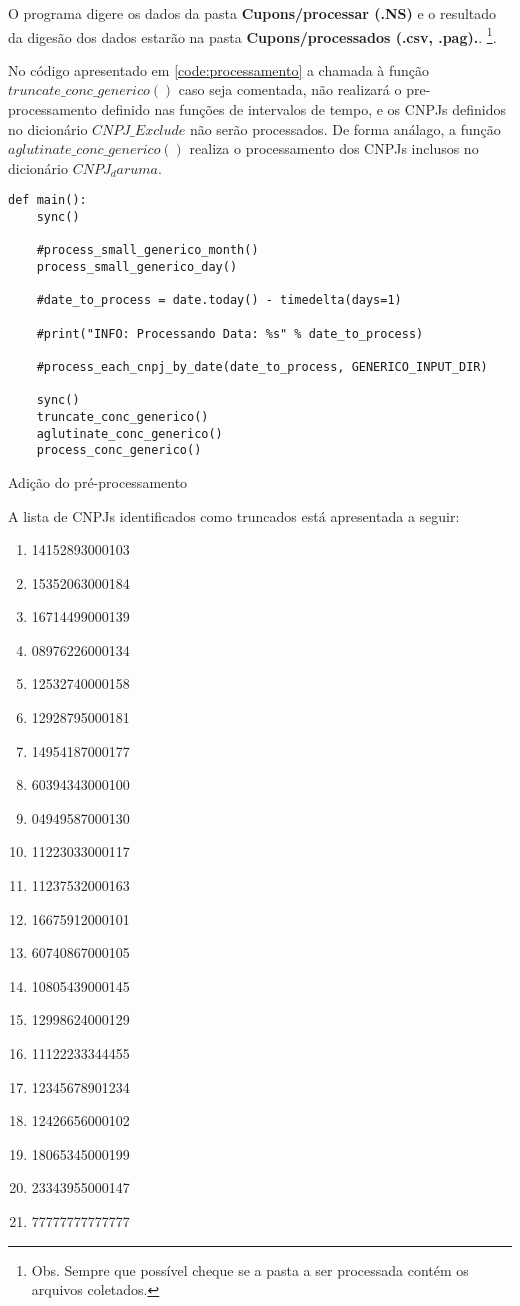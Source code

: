 \documentclass{article}      %
\begin{document}
O programa digere os dados da pasta \textbf{Cupons/processar (.NS)} e o resultado da digesão dos dados estarão na pasta \textbf{Cupons/processados (.csv, .pag).}.  \footnote{Obs. Sempre que possível cheque se a pasta a ser processada contém os arquivos coletados.}.

No código apresentado em \ref{code:processamento} a chamada à função $truncate\_conc\_generico()$ caso seja comentada, não realizará o pre-processamento definido nas funções de intervalos de tempo, e os CNPJs definidos no dicionário $CNPJ\_Exclude$ não serão processados. De forma análago, a função     $aglutinate\_conc\_generico()$ realiza o processamento dos CNPJs inclusos no dicionário $CNPJ_daruma$.
 
\begin{listing}[H]
\begin{verbatim}
def main():
    sync()
    
    #process_small_generico_month()
    process_small_generico_day()

    #date_to_process = date.today() - timedelta(days=1)
    
    #print("INFO: Processando Data: %s" % date_to_process)
    
    #process_each_cnpj_by_date(date_to_process, GENERICO_INPUT_DIR)

    sync()
    truncate_conc_generico()
    aglutinate_conc_generico()
    process_conc_generico()
\end{verbatim}

\caption{Adição do pré-processamento}
\label{code:processamento}

\end{listing}


A lista de CNPJs identificados como truncados está apresentada a seguir:

\begin{enumerate}
\item 14152893000103 
\item 15352063000184 
\item 16714499000139
\item 08976226000134
\item 12532740000158 
\item 12928795000181 
\item 14954187000177 
\item 60394343000100 
\item 04949587000130 
\item 11223033000117
\item 11237532000163
\item 16675912000101 
\item 60740867000105 
\item 10805439000145
\item 12998624000129 
\item 11122233344455 
\item 12345678901234
\item 12426656000102
\item 18065345000199
\item 23343955000147
\item 77777777777777
\end{enumerate}
\end{document}

